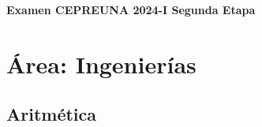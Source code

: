 
\clearpage
\thispagestyle{empty}

\vspace*{\fill}
\begin{center}
	{\Huge\bfseries Examen CEPREUNA 2024-I Segunda Etapa}
\end{center}
\vspace*{\fill}

\clearpage

\section*{Área: Ingenierías}


\subsection*{Aritmética}

